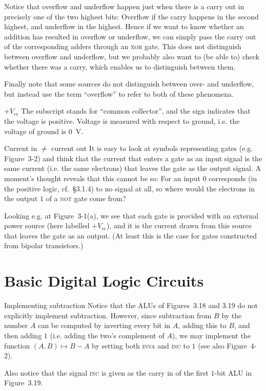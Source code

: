 \documentclass[article, a4paper, 11pt, oneside]{memoir}
\numberwithin{equation}{chapter}
\newcommand{\gate}{\textsc}
\newcommand{\gateNOT}{\gate{not}}
\newcommand{\gateXOR}{\gate{xor}}
\newcounter{desccount}
\begin{document}
\begin{notelist}
Notice that overflow and underflow happen just when there is a carry out in precisely one of the two highest bits: Overflow if the carry happens in the second highest, and underflow in the highest. Hence if we want to know whether an addition has resulted in overflow or underflow, we can simply pass the carry out of the corresponding adders through an \gateXOR{} gate. This does not distinguish between overflow and underflow, but we probably also want to (be able to) check whether there was a carry, which enables us to distinguish between them.

Finally note that some sources do not distinguish between over- and underflow, but instead use the term \enquote{overflow} to refer to both of these phenomena.

\item[$+V_{\mathrm{cc}}$]
The subscript stands for \enquote{common collector}, and the sign indicates that the voltage is positive. Voltage is measured with respect to ground, i.e. the voltage of ground is \SI{0}{\volt}.

\item[Current in $\neq$ current out]\label{note:current-in-out} %
It is easy to look at symbols representing gates (e.g. Figure~3-2) and think that the current that enters a gate as an input signal is the same current (i.e. the same electrons) that leaves the gate as the output signal. A moment's thought reveals that this cannot be so: For an input $0$ corresponds (in the positive logic, cf.~§3.1.4) to no signal at all, so where would the electrons in the output $1$ of a \gateNOT{} gate come from?

Looking e.g. at Figure~3-1(a), we see that each gate is provided with an external power source (here labelled $+V_{\mathrm{cc}}$), and it is the current drawn from this source that leaves the gate as an output. (At least this is the case for gates constructed from bipolar transistors.)
\end{notelist}


\section{Basic Digital Logic Circuits}

\begin{notelist}
\item[Implementing subtraction]
Notice that the ALUs of Figures~3.18 and 3.19 do not explicitly implement subtraction. However, since subtraction from $B$ by the number $A$ can be computed by inverting every bit in $A$, adding this to $B$, and then adding $1$ (i.e. adding the two's complement of $A$), we may implement the function $(A,B) \mapsto B - A$ by setting both \textsc{inva} and \textsc{inc} to $1$ (see also Figure~4-2).

Also notice that the signal \textsc{inc} is given as the carry in of the first $1$-bit ALU in Figure~3.19.
\end{notelist}
\end{document}
